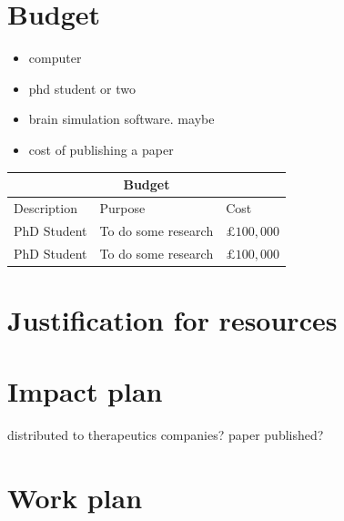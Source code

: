 \documentclass{epsrc}
\begin{document}
\part{Budget}
\begin{itemize}
\item computer
\item phd student or two
\item brain simulation software. maybe 
\item cost of publishing a paper
\end{itemize}

\begin{center}
\begin{tabular}{ |p{3cm}|p{7cm}|p{3cm}|  }
 \hline
 \multicolumn{3}{|c|}{Budget} \\
 \hline
 Description & Purpose & Cost\\
 \hline
 PhD Student   & To do some research  &  $\pounds 100,000$\\
 PhD Student   & To do some research  &  $\pounds 100,000$\\
 \hline
\end{tabular}
\end{center}

\part{Justification for resources}

\part{Impact plan}
distributed to therapeutics companies?
paper published?
\part{Work plan}



\end{document}
